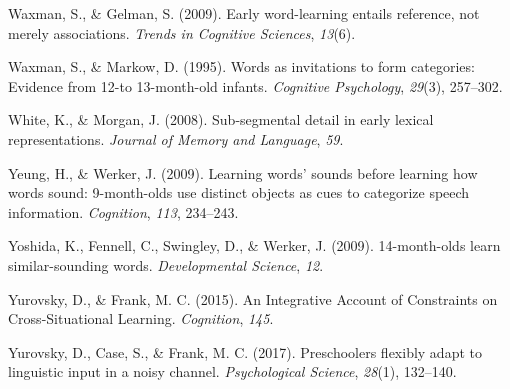 \documentclass[english,,man,floatsintext]{apa6}
\theoremstyle{definition}
\theoremstyle{definition}
\theoremstyle{definition}
\theoremstyle{remark}
\begin{document}
\hypertarget{ref-waxman2009}{}
Waxman, S., \& Gelman, S. (2009). Early word-learning entails reference,
not merely associations. \emph{Trends in Cognitive Sciences},
\emph{13}(6).

\hypertarget{ref-waxman1995}{}
Waxman, S., \& Markow, D. (1995). Words as invitations to form
categories: Evidence from 12-to 13-month-old infants. \emph{Cognitive
Psychology}, \emph{29}(3), 257--302.

\hypertarget{ref-white2008b}{}
White, K., \& Morgan, J. (2008). Sub-segmental detail in early lexical
representations. \emph{Journal of Memory and Language}, \emph{59}.

\hypertarget{ref-yeung09}{}
Yeung, H., \& Werker, J. (2009). Learning words' sounds before learning
how words sound: 9-month-olds use distinct objects as cues to categorize
speech information. \emph{Cognition}, \emph{113}, 234--243.

\hypertarget{ref-yoshida2009}{}
Yoshida, K., Fennell, C., Swingley, D., \& Werker, J. (2009).
14-month-olds learn similar-sounding words. \emph{Developmental
Science}, \emph{12}.

\hypertarget{ref-yurovsky2015}{}
Yurovsky, D., \& Frank, M. C. (2015). An Integrative Account of
Constraints on Cross-Situational Learning. \emph{Cognition}, \emph{145}.

\hypertarget{ref-yurovsky2017}{}
Yurovsky, D., Case, S., \& Frank, M. C. (2017). Preschoolers flexibly
adapt to linguistic input in a noisy channel. \emph{Psychological
Science}, \emph{28}(1), 132--140.
\end{document}
